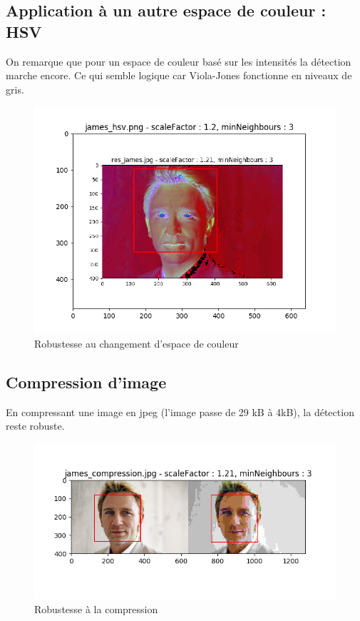 \documentclass[a4paper,11pt]{article}
\begin{document}
    \subsection{Application à un autre espace de couleur : HSV}
	
	On remarque que pour un espace de couleur basé sur les intensités la détection marche
	encore. Ce qui semble logique car Viola-Jones fonctionne en niveaux de gris.
	    
	    \begin{figure}[H]
	        \begin{center}
	           \includegraphics[scale = 0.6]{images/james_hsv_1,2_3.png}
	           \caption{Robustesse au changement d'espace de couleur}
	           \label{fig:hsv}
	        \end{center}
	    \end{figure}
	
    
    \subsection{Compression d'image}

	En compressant une image en jpeg (l'image passe de 29 kB à 4kB), la détection reste robuste.

	    \begin{figure}[H]
	        \begin{center}
	           \includegraphics[scale = 0.6]{images/james_compression_1,21_3.png}
	           \caption{Robustesse à la compression}
	           \label{fig:edward}
	        \end{center}
	    \end{figure}
	
\end{document}
